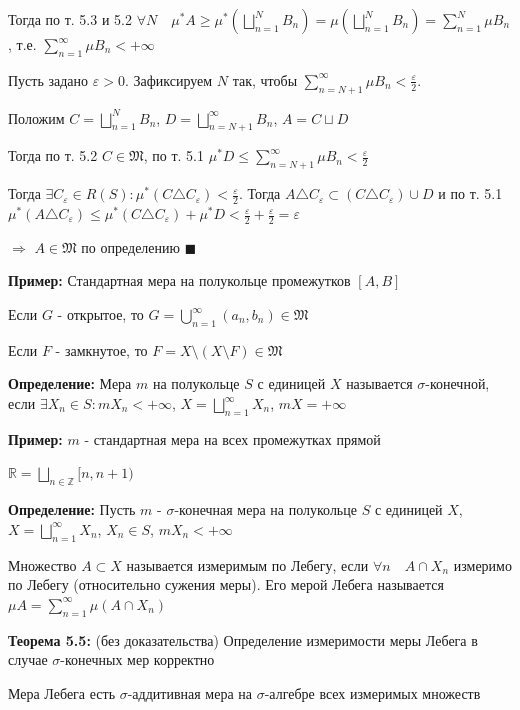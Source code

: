 \documentclass[a4paper]{report}
\begin{document}
Тогда по т. 5.3 и 5.2 $\forall N\quad\mu^*A\ge\mu^*(\bigsqcup\limits_{n=1}^N B_n)=\mu(\bigsqcup\limits_{n=1}^N B_n)=
\sum\limits_{n=1}^N\mu B_n$, т.е. $\sum\limits_{n=1}^\infty \mu B_n<+\infty$

Пусть задано $\varepsilon>0$. Зафиксируем $N$ так, чтобы $\sum\limits_{n=N+1}^\infty\mu B_n<\frac\varepsilon 2$.

Положим $C=\bigsqcup\limits_{n=1}^N B_n$, $D=\bigsqcup\limits_{n=N+1}^\infty B_n$, $A=C\sqcup D$

Тогда по т. 5.2 $C\in\mathfrak M$, по т. 5.1 $\mu^*D\le\sum\limits_{n=N+1}^\infty\mu B_n<\frac\varepsilon2$

Тогда $\exists C_\varepsilon\in R(S)\colon\mu^*(C\triangle C_\varepsilon)<\frac\varepsilon 2$. Тогда $A\triangle C_\varepsilon\subset
(C\triangle C_\varepsilon)\cup D$ и по т. 5.1 $\mu^*(A\triangle C_\varepsilon)\le\mu^*(C\triangle C_\varepsilon)+\mu^*D<
\frac\varepsilon2+\frac\varepsilon2=\varepsilon$

$\Rightarrow$ $A\in\mathfrak M$ по определению $\blacksquare$
\bigskip

\noindent\textbf{Пример:} Стандартная мера на полукольце промежутков $[A,B]$

Если $G$ - открытое, то $G=\bigcup\limits_{n=1}^\infty(a_n,b_n)\in\mathfrak M$

Если $F$ - замкнутое, то $F=X\setminus(X\setminus F)\in\mathfrak M$
\bigskip

\noindent\textbf{Определение:} Мера $m$ на полукольце $S$ с единицей $X$ называется $\sigma$-конечной, если $\exists
X_n\in S\colon mX_n<+\infty$, $X=\bigsqcup\limits_{n=1}^\infty X_n$, $mX=+\infty$
\bigskip

\noindent\textbf{Пример:} $m$ - стандартная мера на всех промежутках прямой

$\mathbb R=\bigsqcup\limits_{n\in\mathbb Z}[n,n+1)$
\bigskip

\noindent\textbf{Определение:} Пусть $m$ - $\sigma$-конечная мера на полукольце  $S$ с единицей $X$, $X=\bigsqcup
\limits_{n=1}^\infty X_n$, $X_n\in S$, $mX_n<+\infty$

Множество $A\subset X$ называется измеримым по Лебегу, если $\forall n\quad A\cap X_n$ измеримо по Лебегу (относительно
сужения меры). Его мерой Лебега называется $\mu A=\sum\limits_{n=1}^\infty\mu(A\cap X_n)$
\bigskip

\noindent\textbf{Теорема 5.5:} (без доказательства) Определение измеримости меры Лебега в случае $\sigma$-конечных мер
корректно

Мера Лебега есть $\sigma$-аддитивная мера на $\sigma$-алгебре всех измеримых множеств
\end{document}
